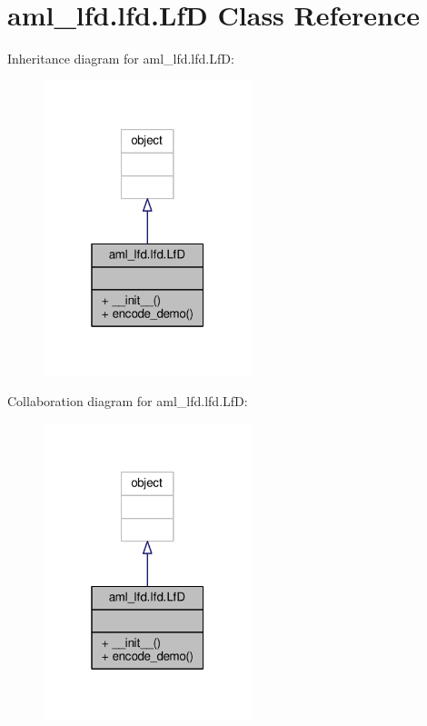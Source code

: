 \hypertarget{classaml__lfd_1_1lfd_1_1_lf_d}{\section{aml\-\_\-lfd.\-lfd.\-Lf\-D Class Reference}
\label{classaml__lfd_1_1lfd_1_1_lf_d}
}


Inheritance diagram for aml\-\_\-lfd.\-lfd.\-Lf\-D\-:
\nopagebreak
\begin{figure}[H]
\begin{center}
\leavevmode
\includegraphics[width=172pt]{classaml__lfd_1_1lfd_1_1_lf_d__inherit__graph}
\end{center}
\end{figure}


Collaboration diagram for aml\-\_\-lfd.\-lfd.\-Lf\-D\-:
\nopagebreak
\begin{figure}[H]
\begin{center}
\leavevmode
\includegraphics[width=172pt]{classaml__lfd_1_1lfd_1_1_lf_d__coll__graph}
\end{center}
\end{figure}
